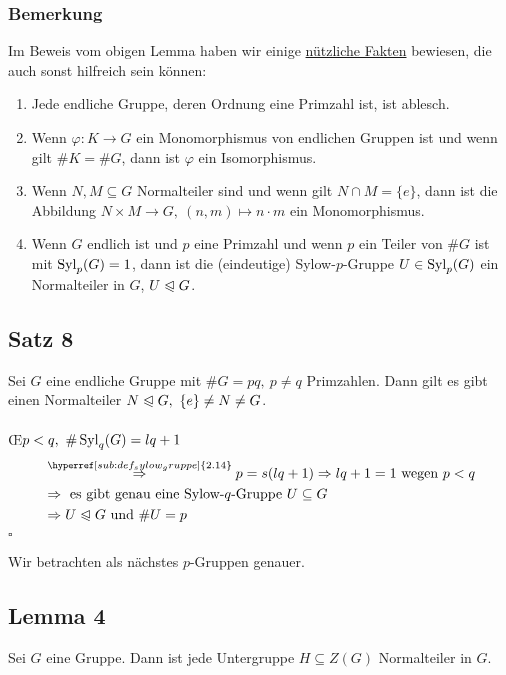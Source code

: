 \subsubsection*{Bemerkung}
Im Beweis vom obigen Lemma haben wir einige \uline{nützliche Fakten} bewiesen, die auch sonst hilfreich sein können:
\begin{enumerate}[(1)]
	\item Jede endliche Gruppe, deren Ordnung eine Primzahl ist, ist ablesch.
	\item Wenn $\varphi:K\to G$ ein Monomorphismus von endlichen Gruppen ist und wenn gilt $\#K=\#G$, dann ist $\varphi$ ein Isomorphismus.
	\item Wenn $N,M\subseteq G$ Normalteiler sind und wenn gilt $N\cap M=\{e\}$, dann ist die Abbildung $N\times M\to G,~(n,m)\mapsto n\cdot m$ ein Monomorphismus.
	\item Wenn $G$ endlich ist und $p$ eine Primzahl und wenn $p$ ein Teiler von $\#G$ ist mit $\operatorname{Syl}_p(G)=1$, dann ist die (eindeutige) Sylow-$p$-Gruppe $U\in \operatorname{Syl}_p(G)$ ein Normalteiler in $G$, $U\trianglelefteqslant G$.
\end{enumerate}


\subsection{Satz 8}
\label{sub:satz_8}
Sei $G$ eine endliche Gruppe mit $\#G=pq,~p\not=q$ Primzahlen. Dann gilt es gibt einen Normalteiler $N\trianglelefteqslant G,~\{e\}\not=N\not=G$.\\

\\
\OE $p<q,~\#\operatorname{Syl}_q(G)=lq+1$
\begin{equation*}
\begin{aligned}
	&\stackrel{\hyperref[sub:def_sylow_gruppe]{2.14}}{\Rightarrow} p=s(lq+1) \Rightarrow lq+1=1 \text{ wegen } p<q\\
	&\Rightarrow \text{ es gibt genau eine Sylow-$q$-Gruppe } U\subseteq G\\
	&\Rightarrow U\nt G\text{ und } \#U=p
\end{aligned}
\end{equation*}
\hfill $\square$

Wir betrachten als nächstes $p$-Gruppen genauer.\\

\subsection{Lemma 4}
\label{sub:lemma_4}
Sei $G$ eine Gruppe. Dann ist jede Untergruppe $H\subseteq Z(G)$ Normalteiler in $G$.\\

